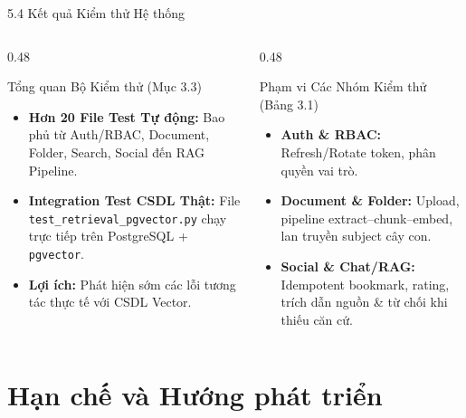 \documentclass[10pt, aspectratio=169]{beamer}
\begin{document}
\begin{frame}{5.4 Kết quả Kiểm thử Hệ thống}
    \begin{columns}[T]
        \begin{column}{0.48\textwidth}
            \begin{block}{Tổng quan Bộ Kiểm thử (Mục 3.3)}
                \begin{itemize}
                    \item \textbf{Hơn 20 File Test Tự động:} Bao phủ từ Auth/RBAC, Document, Folder, Search, Social đến RAG Pipeline.
                    \item \textbf{Integration Test CSDL Thật:} File \texttt{test\_retrieval\_pgvector.py} chạy trực tiếp trên PostgreSQL + \texttt{pgvector}.
                    \item \textbf{Lợi ích:} Phát hiện sớm các lỗi tương tác thực tế với CSDL Vector.
                \end{itemize}
            \end{block}
        \end{column}

        \begin{column}{0.48\textwidth}
            \begin{exampleblock}{Phạm vi Các Nhóm Kiểm thử (Bảng 3.1)}
                \begin{itemize}
                    \item \textbf{Auth \& RBAC:} Refresh/Rotate token, phân quyền vai trò.
                    \item \textbf{Document \& Folder:} Upload, pipeline extract--chunk--embed, lan truyền subject cây con.
                    \item \textbf{Social \& Chat/RAG:} Idempotent bookmark, rating, trích dẫn nguồn \& từ chối khi thiếu căn cứ.
                \end{itemize}
            \end{exampleblock}
        \end{column}
    \end{columns}
\end{frame}

\section{Hạn chế và Hướng phát triển}
\end{document}
